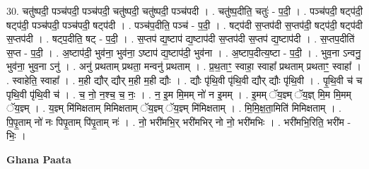 \documentclass[17pt]{extarticle}
\begin{document}
30. चतु॑ष्पदी॒ पञ्च॑पदी॒ पञ्च॑पदी॒ चतु॑ष्पदी॒ चतु॑ष्पदी॒ पञ्च॑पदी । . चतु॑ष्प॒दीति॒ चतुः॑ - प॒दी॒ । . पञ्च॑पदी॒ षट्प॑दी॒ षट्प॑दी॒ पञ्च॑पदी॒ पञ्च॑पदी॒ षट्प॑दी । . पञ्च॑प॒दीति॒ पञ्च॑ - प॒दी॒ । . षट्प॑दी स॒प्तप॑दी स॒प्तप॑दी॒ षट्प॑दी॒ षट्प॑दी स॒प्तप॑दी । . षट्प॒दीति॒ षट् - प॒दी॒ । . स॒प्तप॑ द्य॒ष्टाप॑ द्य॒ष्टाप॑दी स॒प्तप॑दी स॒प्तप॑ द्य॒ष्टाप॑दी । . स॒प्तप॒दीति॑ स॒प्त - प॒दी॒ । . अ॒ष्टाप॑दी॒ भुव॑ना॒ भुव॑ना॒ ऽष्टाप॑ द्य॒ष्टाप॑दी॒ भुव॑ना । . अ॒ष्टाप॒दीत्य॒ष्टा - प॒दी॒ । . भुव॒ना ऽन्वनु॒ भुव॑ना॒ भुव॒ना ऽनु॑ । . अनु॑ प्रथताम् प्रथता॒ मन्वनु॑ प्रथताम् । . प्र॒थ॒ताꣳ॒॒ स्वाहा॒ स्वाहा᳚ प्रथताम् प्रथताꣳ॒॒ स्वाहा᳚ । . स्वाहेति॒ स्वाहा᳚ । . म॒ही द्यौर् द्यौर् म॒ही म॒ही द्यौः । . द्यौः पृ॑थि॒वी पृ॑थि॒वी द्यौर् द्यौः पृ॑थि॒वी । . पृ॒थि॒वी च॑ च पृथि॒वी पृ॑थि॒वी च॑ । . च॒ नो॒ न॒श्च॒ च॒ नः॒ । . न॒ इ॒म मि॒मम् नो॑ न इ॒मम् । . इ॒मम् ॅय॒ज्ञ्म् ॅय॒ज्ञ् मि॒म मि॒मम् ॅय॒ज्ञ्म् । . य॒ज्ञ्म् मि॑मिक्षताम् मिमिक्षताम् ॅय॒ज्ञ्म् ॅय॒ज्ञ्म् मि॑मिक्षताम् । . मि॒मि॒क्ष॒ता॒मिति॑ मिमिक्षताम् । . पि॒पृ॒ताम् नो॑ नः पिपृ॒ताम् पि॑पृ॒ताम् नः॑ । . नो॒ भरी॑मभि॒र् भरी॑मभिर् नो नो॒ भरी॑मभिः । . भरी॑मभि॒रिति॒ भरी॑म - भिः॒ । \newline

\textbf{Ghana Paata } \newline
\end{document}
